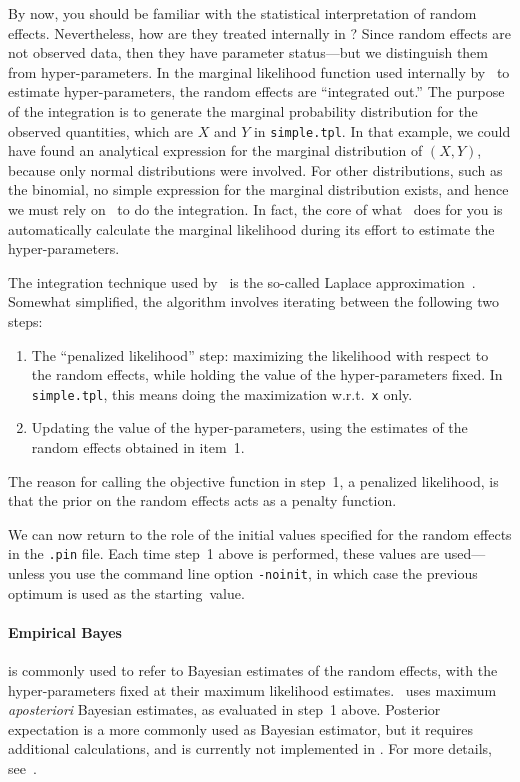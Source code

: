 \documentclass{admbmanual}
\newcommand{\citeasnoun}{\cite}
\begin{document}
By now, you should be familiar with the statistical interpretation of random effects.
Nevertheless, how are they treated internally in \scAR? Since random effects are not observed data, then they have parameter status---but we distinguish them from hyper-parameters. In the marginal likelihood function used
internally by \scAR\ to estimate hyper-parameters, the random effects are ``integrated out.'' The purpose of the
integration is to generate the marginal probability distribution for the observed quantities, which are $X$ and
$Y$ in \texttt{simple.tpl}. In that example, we could have found an analytical expression for the marginal
distribution of $(X,Y)$, because only normal distributions were involved. For other distributions, such as the
binomial, no simple expression for the marginal distribution exists, and hence we must rely on \scAB\ to do the
integration. In fact, the core of what \scAR\ does for you is automatically calculate the marginal
likelihood during its effort to estimate the hyper-parameters. 

The integration technique used by \scAR\ is the so-called Laplace approximation~\cite{skaug_fournier1996aam}.
Somewhat simplified, the algorithm involves iterating between the following two steps:
\begin{enumerate}
\item The ``penalized likelihood'' step: maximizing the likelihood with
respect to the random effects, while holding the value of the hyper-parameters fixed.
In \texttt{simple.tpl}, this means doing the maximization w.r.t.~\texttt{x} only.

\item Updating the value of the hyper-parameters, using the estimates of the
random effects obtained in item~1. 
\end{enumerate}
The reason for calling the objective function in step~1, a penalized likelihood,
is that the prior on the random effects acts as a penalty function.

We can now return to the role of the initial values specified for the random effects in the \texttt{.pin} file.
Each time step~1 above is performed, these values are used---unless you use the command line option \texttt{-noinit},
in which case the previous optimum is used as the starting~value.

\paragraph{Empirical Bayes} is commonly used to refer to Bayesian estimates of the random effects, with
the hyper-parameters fixed at their maximum likelihood estimates. \scAR\ uses
maximum \textit{aposteriori} Bayesian estimates, as evaluated in step~1 above. 
Posterior expectation is a more commonly used as Bayesian estimator, but it requires additional calculations, and
is currently not implemented in \scAR. For more details, see~\citeasnoun{skaug_fournier1996aam}.
\end{document}
